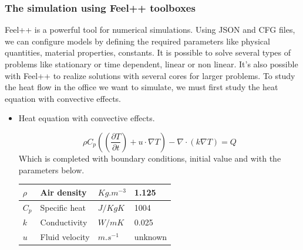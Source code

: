 \subsubsection{The simulation using Feel++ toolboxes}
\noindent Feel++ is a powerful tool for numerical simulations. 
Using JSON and CFG files, we can configure models by defining the required parameters like physical quantities, material properties, constants. It is possible to solve several types of problems like stationary or time dependent, linear or non linear. It's also possible with Feel++ to realize solutions with several cores for larger problems.
\newline
\newline
\newline\noindent To study the heat flow in the office we want to simulate, we must first study the heat equation with convective effects.  
\begin{itemize}
    \item Heat equation with convective effects.

 $$\rho C_p((\frac{\partial T}{\partial t})+u \cdot \nabla T)-\nabla \cdot (k \nabla T)=Q$$
\noindent Which is completed with boundary conditions, initial value and with the parameters below.
\newline
\newline
\newline
\renewcommand{\arraystretch}{2}
\begin{tabular}{|R{3cm}|C{5cm}|L{3cm}|L{3cm}|}
\hline
$\rho$ & Air density & $Kg.m^
{-3}$ & 1.125  \\[0.5cm]
\hline
$C_p$ & Specific heat & $J/KgK$ & 1004 \\[0.5cm]
\hline
$k$ & Conductivity & $W/mK$ & 0.025  \\[0.5cm]
\hline
$u$ & Fluid velocity & $m.s^{-1}$ & unknown \\[0.5cm]
\hline
\end{tabular}
\end{itemize}

